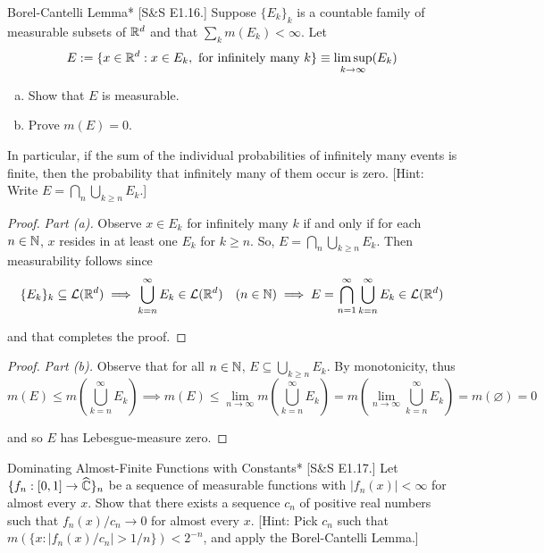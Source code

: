 \begin{problem}{Borel-Cantelli Lemma}*
    [S\&S E1.16.] Suppose \(\{E_k\}_k\) is a countable family of measurable subsets of \(\mathbb{R}^d\) and that \(\sum_k m(E_k) < \infty\). Let 
    \[
    E := \{x \in \mathbb{R}^d : x \in E_k, \text{ for infinitely many } k\}
    \equiv \limsup_{k \to \infty} (E_k)
    \]

    \begin{enumerate}[(a)]
        \item Show that \(E\) is measurable. 
        \item Prove \(m(E) = 0\). 
    \end{enumerate}
    In particular, if the sum of the individual probabilities of infinitely many events is finite, then the probability that infinitely many of them occur is zero. [Hint: Write \(E = \bigcap_n \bigcup_{k \geq n} E_k\).]
\end{problem}

\begin{proof}
    \textit{Part (a).} Observe \(x \in E_k\) for infinitely many \(k\) if and only if for each \(n \in \mathbb{N}\), \(x\) resides in at least one \(E_k\) for \(k \geq n\). So, \(E = \bigcap_n \bigcup_{k \geq n} E_k\). Then measurability follows since 
    \[
    \{E_k\}_k \subseteq \mathcal{L}(\mathbb{R}^d)
    \implies \bigcup_{k = n}^\infty E_k \in \mathcal{L}(\mathbb{R}^d) \quad (n \in \mathbb{N})
    \implies E = \bigcap_{n=1}^\infty \bigcup_{k = n}^\infty E_k \in \mathcal{L}(\mathbb{R}^d)
    \]

    and that completes the proof.
\end{proof}

\begin{proof}
    \textit{Part (b).} Observe that for all \(n \in \mathbb{N}\), \(E \subseteq \bigcup_{k \geq n} E_k\). By monotonicity, thus 
    \[
        m(E) 
        \leq m \left( \bigcup_{k = n}^\infty E_k \right)
        \implies 
        m(E) 
        \leq \lim_{n \to \infty} m\left(\bigcup_{k = n}^\infty E_k \right) 
        = m\left(\lim_{n \to \infty} \bigcup_{k = n}^\infty E_k \right) 
        = m(\varnothing) 
        = 0
    \]

    and so \(E\) has Lebesgue-measure zero. 
\end{proof}

\begin{problem}{Dominating Almost-Finite Functions with Constants}*
    [S\&S E1.17.] Let \(\{f_n : [0, 1] \to \widehat{\mathbb{C}}\}_n\) be a sequence of measurable functions with \(|f_n(x)|<\infty\) for almost every \(x\). Show that there exists a sequence \(c_n\) of positive real numbers such that \(f_n(x) / c_n \to 0\) for almost every \(x\). [Hint: Pick \(c_n\) such that \(m(\{x : |f_n(x) / c_n| > 1/n\}) < 2^{-n}\), and apply the Borel-Cantelli Lemma.]
\end{problem}

